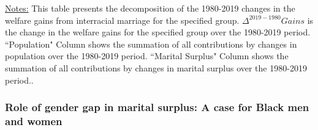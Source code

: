 \begin{table}[H] \caption{Decomposition of the 1980-2019 Changes in the Welfare Gain from Interracial Marriage} \label{tab:decompoverall}
\begin{center}
\begin{minipage}{14cm}
\begin{spacing}{0.9}
{\footnotesize{\underline{Notes:} This table presents the decomposition of the 1980-2019 changes in the welfare gains from interracial marriage for the specified group. $\Delta^{2019-1980} Gains$ is the change in the welfare gains for the specified group over the 1980-2019 period. ``Population" Column shows the summation of all contributions by changes in population over the 1980-2019 period. ``Marital Surplus" Column shows the summation of all contributions by changes in marital surplus over the 1980-2019 period..}}
\end{spacing}
\end{minipage}
\end{center}									
\end{table}




\subsubsection{Role of gender gap in marital surplus: A case for Black men and women}

